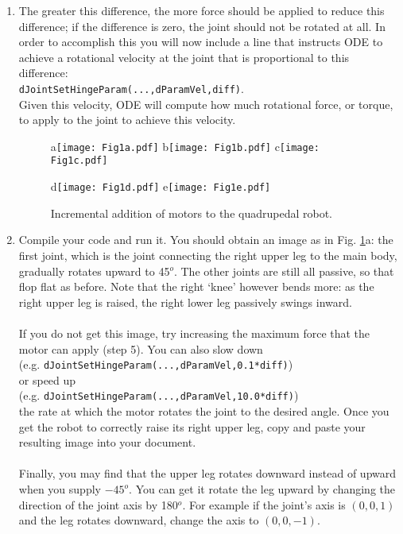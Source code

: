 \documentclass[12pt]{article}
\begin{document}
\begin{enumerate}
\item The greater this difference, the more force should be applied to reduce this difference; if the difference is zero, the joint should not be rotated at all. In order to accomplish this you will now include a line that instructs ODE to achieve a rotational velocity at the joint that is proportional to this difference: \\
    \texttt{dJointSetHingeParam(...,dParamVel,diff)}. \\
    Given this velocity, ODE will compute how much rotational force, or torque, to apply to the joint to achieve this velocity.

\begin{figure}[!t]
\centerline{
a\texttt{[image: Fig1a.pdf]}
b\texttt{[image: Fig1b.pdf]}
c\texttt{[image: Fig1c.pdf]}}
\centerline{
d\texttt{[image: Fig1d.pdf]}
e\texttt{[image: Fig1e.pdf]}}
\caption{Incremental addition of motors to the quadrupedal robot.}
\label{Fig1}
\end{figure}

\item Compile your code and run it. You should obtain an image as in Fig. \ref{Fig1}a: the first joint, which is the joint connecting the right upper leg to the main body, gradually rotates upward to 45$^o$. The other joints are still all passive, so that flop flat as before. Note that the right `knee' however bends more: as the right upper leg is raised, the right lower leg passively swings inward. \\ \\
    If you do not get this image, try increasing the maximum force that the motor can apply (step 5). You can also slow down \\
    (e.g. \texttt{dJointSetHingeParam(...,dParamVel,0.1*diff)}) \\
    or speed up \\
    (e.g. \texttt{dJointSetHingeParam(...,dParamVel,10.0*diff)}) \\
    the rate at which the motor rotates the joint to the desired angle. Once you get the robot to correctly raise its right upper leg, copy and paste your resulting image into your document. \\ \\
    Finally, you may find that the upper leg rotates downward instead of upward when you supply $-45^o$. You can get it rotate the leg upward by changing the direction of the joint axis by 180$^o$. For example if the joint's axis is $(0,0,1)$ and the leg rotates downward, change the axis to $(0,0,-1)$.


\end{enumerate}
\end{document}

